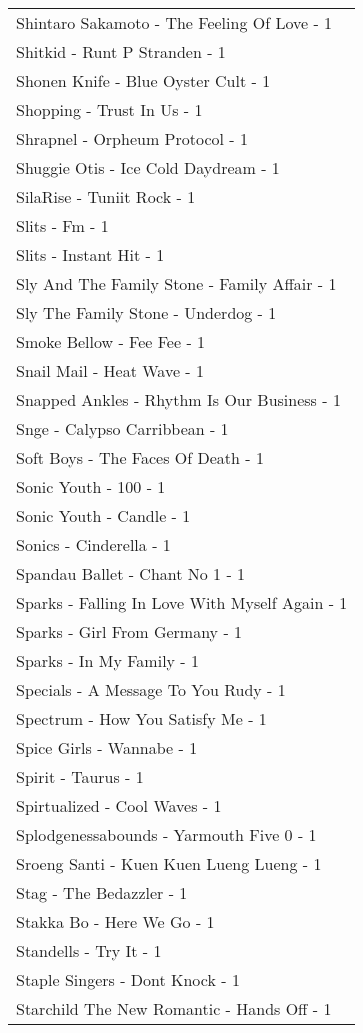 \documentclass[
]{article}
\begin{document}
\begin{longtable}{l}
Shintaro Sakamoto - The Feeling Of Love - 1 \\ 
Shitkid - Runt P Stranden - 1 \\ 
Shonen Knife - Blue Oyster Cult - 1 \\ 
Shopping - Trust In Us - 1 \\ 
Shrapnel - Orpheum Protocol - 1 \\ 
Shuggie Otis - Ice Cold Daydream - 1 \\ 
SilaRise - Tuniit Rock - 1 \\ 
Slits - Fm - 1 \\ 
Slits - Instant Hit - 1 \\ 
Sly And The Family Stone - Family Affair - 1 \\ 
Sly The Family Stone - Underdog - 1 \\ 
Smoke Bellow - Fee Fee - 1 \\ 
Snail Mail - Heat Wave - 1 \\ 
Snapped Ankles - Rhythm Is Our Business - 1 \\ 
Snge - Calypso Carribbean - 1 \\ 
Soft Boys - The Faces Of Death - 1 \\ 
Sonic Youth - 100 - 1 \\ 
Sonic Youth - Candle - 1 \\ 
Sonics - Cinderella - 1 \\ 
Spandau Ballet - Chant No 1 - 1 \\ 
Sparks - Falling In Love With Myself Again - 1 \\ 
Sparks - Girl From Germany - 1 \\ 
Sparks - In My Family - 1 \\ 
Specials - A Message To You Rudy - 1 \\ 
Spectrum - How You Satisfy Me - 1 \\ 
Spice Girls - Wannabe - 1 \\ 
Spirit - Taurus - 1 \\ 
Spirtualized - Cool Waves - 1 \\ 
Splodgenessabounds - Yarmouth Five 0 - 1 \\ 
Sroeng Santi - Kuen Kuen Lueng Lueng - 1 \\ 
Stag - The Bedazzler - 1 \\ 
Stakka Bo - Here We Go - 1 \\ 
Standells - Try It - 1 \\ 
Staple Singers - Dont Knock - 1 \\ 
Starchild The New Romantic - Hands Off - 1 \\ 

\end{longtable}
\end{document}
